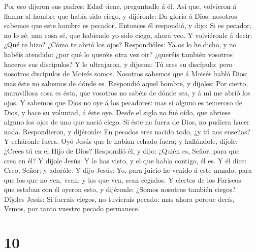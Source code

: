  Por eso dijeron sus padres: Edad tiene, preguntadle á él.
 Así que, volvieron á llamar al hombre que había sido
ciego, y dijéronle: Da gloria á Dios: nosotros sabemos que este hombre
es pecador.  Entonces él respondió, y dijo: Si es pecador,
no lo sé: una cosa sé, que habiendo yo sido ciego, ahora veo.
 Y volviéronle á decir: ¿Qué te hizo? ¿Cómo te abrió los
ojos?  Respondióles: Ya os lo he dicho, y no habéis
atendido: ¿por qué lo queréis otra vez oir? ¿queréis también vosotros
haceros sus discípulos?  Y le ultrajaron, y dijeron: Tú
eres su discípulo; pero nosotros discípulos de Moisés somos.
 Nosotros sabemos que á Moisés habló Dios: mas éste no
sabemos de dónde es.  Respondió aquel hombre, y díjoles:
Por cierto, maravillosa cosa es ésta, que vosotros no sabéis de dónde
sea, y á mí me abrió los ojos.  Y sabemos que Dios no oye á
los pecadores: mas si alguno es temeroso de Dios, y hace su voluntad, á
éste oye.  Desde el siglo no fué oído, que abriese alguno
los ojos de uno que nació ciego.  Si éste no fuera de Dios,
no pudiera hacer nada.  Respondieron, y dijéronle: En
pecados eres nacido todo, ¿y tú nos enseñas? Y echáronle fuera.
 Oyó Jesús que le habían echado fuera; y hallándole,
díjole: ¿Crees tú en el Hijo de Dios?  Respondió él, y
dijo: ¿Quién es, Señor, para que crea en él?  Y díjole
Jesús: Y le has visto, y el que habla contigo, él es.  Y él
dice: Creo, Señor; y adoróle.  Y dijo Jesús: Yo, para
juicio he venido á este mundo: para que los que no ven, vean; y los que
ven, sean cegados.  Y ciertos de los Fariseos que estaban
con él oyeron esto, y dijéronle: ¿Somos nosotros también ciegos?
 Díjoles Jesús: Si fuerais ciegos, no tuvierais pecado: mas
ahora porque decís, Vemos, por tanto vuestro pecado permanece.

\hypertarget{section-9}{%
\section{10}\label{section-9}}

